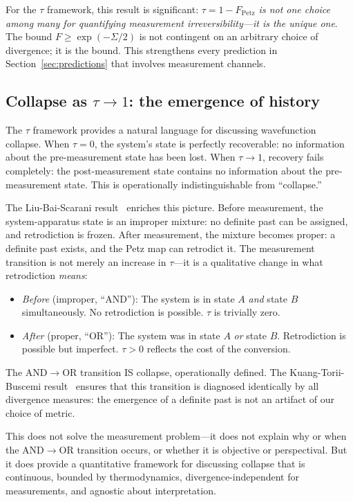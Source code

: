\documentclass[12pt]{article}
\theoremstyle{definition}
\theoremstyle{remark}
\newcommand{\tauasym}{\tau}
\begin{document}
For the $\tauasym$ framework, this result is significant:
\emph{$\tauasym = 1 - F_{\text{Petz}}$ is not one choice among
many for quantifying measurement irreversibility---it is the unique
one}.  The bound $F \geq \exp(-\Sigma/2)$ is not contingent on an
arbitrary choice of divergence; it is the bound.  This strengthens
every prediction in Section~\ref{sec:predictions} that involves
measurement channels.

\subsection{Collapse as $\tauasym \to 1$: the emergence of history}

The $\tauasym$ framework provides a natural language for discussing
wavefunction collapse.  When $\tauasym = 0$, the system's state
is perfectly recoverable: no information about the pre-measurement
state has been lost.  When $\tauasym \to 1$, recovery fails
completely: the post-measurement state contains no information
about the pre-measurement state.  This is operationally
indistinguishable from ``collapse.''

The Liu-Bai-Scarani result~\cite{Liu2026} enriches this picture.
Before measurement, the system-apparatus state is an improper
mixture: no definite past can be assigned, and retrodiction is
frozen.  After measurement, the mixture becomes proper: a definite
past exists, and the Petz map can retrodict it.  The measurement
transition is not merely an increase in $\tauasym$---it is a
qualitative change in what retrodiction \emph{means}:
\begin{itemize}
\item \emph{Before} (improper, ``AND''): The system is in
state $A$ \emph{and} state $B$ simultaneously.  No retrodiction
is possible.  $\tauasym$ is trivially zero.
\item \emph{After} (proper, ``OR''): The system was in state $A$
\emph{or} state $B$.  Retrodiction is possible but imperfect.
$\tauasym > 0$ reflects the cost of the conversion.
\end{itemize}

The AND$\to$OR transition IS collapse, operationally defined.
The Kuang-Torii-Buscemi result~\cite{Kuang2025} ensures that this
transition is diagnosed identically by all divergence measures:
the emergence of a definite past is not an artifact of our choice
of metric.

This does not solve the measurement problem---it does not explain
why or when the AND$\to$OR transition occurs, or whether it is
objective or perspectival.  But it does provide a quantitative
framework for discussing collapse that is continuous, bounded by
thermodynamics, divergence-independent for measurements, and
agnostic about interpretation.
\end{document}
